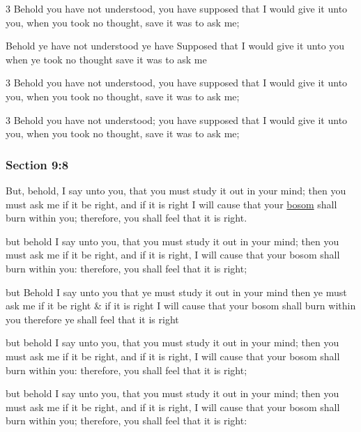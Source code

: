 		\begin{framed}
		\scriptsize
			\begin{compactdesc}
				\item[JSP] 3 Behold you have not understood, you have supposed that I would give it unto you, when you took no thought, save it was to ask me;
				\item[RB1] Behold ye have not understood ye have Supposed that I would give it unto you when ye took no thought save it was to ask me 
				\item[DC 1835] 3 Behold you have not understood, you have supposed that I would give it unto you, when you took no thought, save it was to ask me;
				\item[DC 1844] 3 Behold you have not understood; you have supposed that I would give it unto you, when you took no thought, save it was to ask me; 
			\end{compactdesc}
		\end{framed}

	\subsubsection{Section 9:8} %
		\label{DC9-8}

		But, behold, I say unto you, that you must study it out in your mind; then you must ask me if it be right, and if it is right I will cause that your \hyperref[BOSOM]{bosom} shall burn within you; therefore, you shall feel that it is right.

		\begin{framed}
		\scriptsize
			\begin{compactdesc}
				\item[JSP] but behold I say unto you, that you must study it out in your mind; then you must ask me if it be right, and if it is right, I will cause that your bosom shall burn within you: therefore, you shall feel that it is right;
				\item[RB1] but Behold I say unto you that ye must study it out in your mind then ye must ask me if it be right \& if it is right I will cause that your bosom shall burn within you therefore ye shall feel that it is right 
				\item[DC 1835] but behold I say unto you, that you must study it out in your mind; then you must ask me if it be right, and if it is right, I will cause that your bosom shall burn within you: therefore, you shall feel that it is right; 
				\item[DC 1844] but behold I say unto you, that you must study it out in your mind; then you must ask me if it be right, and if it is right, I will cause that your bosom shall burn within you; therefore, you shall feel that it is right: 
			\end{compactdesc}
		\end{framed}

